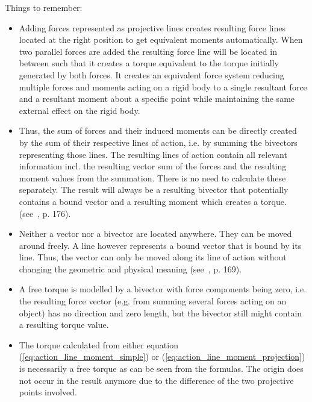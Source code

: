 Things to remember:
\begin{itemize}

    \item Adding forces represented as projective lines creates resulting force lines
    located at the right position to get equivalent moments automatically. When two
    parallel forces are added the resulting force line will be located in between such
    that it creates a torque equivalent to the torque initially generated by both forces.
    It creates an equivalent force system reducing multiple forces and moments acting on a
    rigid body to a single resultant force and a resultant moment about a specific point
    while maintaining the same external effect on the rigid body.

    \item Thus, the sum of forces and their induced moments can be directly created by
    the sum of their respective lines of action, i.e. by summing the bivectors
    representing those lines. The resulting lines of action contain all relevant
    information incl. the resulting vector sum of the forces and the resulting moment
    values from the summation. There is no need to calculate these separately. The result
    will always be a resulting bivector that potentially contains a bound vector and a
    resulting moment which creates a torque.
    (see~\cite{Browne_Grassmann-Algebra_Vol1:2012}, p. 176).

    \item Neither a vector nor a bivector are located anywhere. They can be moved around
    freely. A line however represents a bound vector that is bound by its line. Thus, the
    vector can only be moved along its line of action without changing the geometric and
    physical meaning (see~\cite{Browne_Grassmann-Algebra_Vol1:2012}, p. 169).

    \item A free torque is modelled by a bivector with force components being zero, i.e.
    the resulting force vector (e.g. from summing several forces acting on an object) has
    no direction and zero length, but the bivector still might contain a resulting torque
    value.

    \item The torque calculated from either equation (\ref{eq:action_line_moment_simple})
    or (\ref{eq:action_line_moment_projection}) is necessarily a free torque as can be
    seen from the formulas. The origin does not occur in the result anymore due to the
    difference of the two projective points involved.

\end{itemize}

